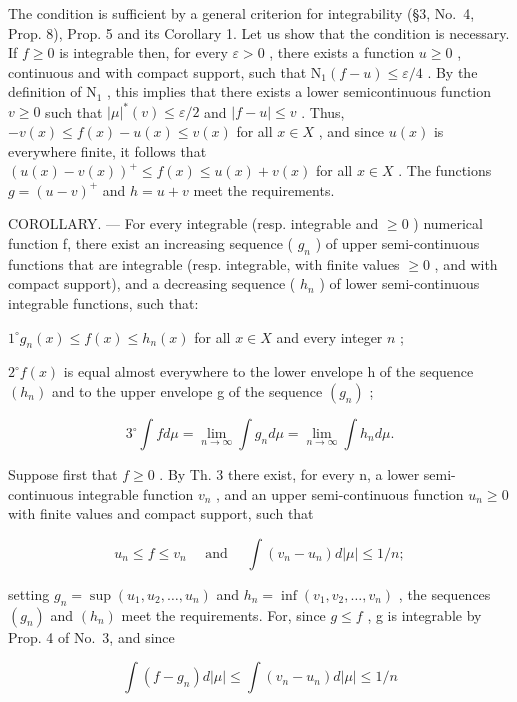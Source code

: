 The condition is sufficient by a general criterion for integrability (§3, No.~4, Prop. 8), Prop. 5 and its Corollary 1. Let us show that the condition is necessary. If \(f \geqslant 0\) is integrable then, for every \(\varepsilon > 0\) , there exists a function \(u \geqslant 0\) , continuous and with compact support, such that \(\mathrm{N}_1(f - u) \leqslant \varepsilon / 4\) . By the definition of \(\mathrm{N}_1\) , this implies that there exists a lower semicontinuous function \(v \geqslant 0\) such that \(|\mu|^*(v) \leqslant \varepsilon / 2\) and \(|f - u| \leqslant v\) . Thus, \(-v(x) \leqslant f(x) - u(x) \leqslant v(x)\) for all \(x \in X\) , and since \(u(x)\) is everywhere finite, it follows that \((u(x) - v(x))^+ \leqslant f(x) \leqslant u(x) + v(x)\) for all \(x \in X\) . The functions \(g = (u - v)^+\) and \(h = u + v\) meet the requirements.

COROLLARY. --- For every integrable (resp. integrable and \(\geqslant0\) ) numerical function f, there exist an increasing sequence ( \(g_{n}\) ) of upper semi-continuous functions that are integrable (resp. integrable, with finite values \(\geqslant0\) , and with compact support), and a decreasing sequence ( \(h_{n}\) ) of lower semi-continuous integrable functions, such that:

\(1^{\circ} g_{n}(x) \leqslant f(x) \leqslant h_{n}(x)\) for all \(x \in X\) and every integer \(n\) ;

\(2^{\circ} f(x)\) is equal almost everywhere to the lower envelope h of the sequence \((h_{n})\) and to the upper envelope g of the sequence \((g_{n})\) ;

\[
3 ^ {\circ} \int f d \mu = \lim _ {n \rightarrow \infty} \int g _ {n} d \mu = \lim _ {n \rightarrow \infty} \int h _ {n} d \mu .
\]

Suppose first that \(f \geqslant 0\) . By Th. 3 there exist, for every n, a lower semi-continuous integrable function \(v_{n}\) , and an upper semi-continuous function \(u_{n} \geqslant 0\) with finite values and compact support, such that

\[
u _ {n} \leqslant f \leqslant v _ {n} \quad \text { and } \quad \int (v _ {n} - u _ {n}) d | \mu | \leqslant 1 / n;
\]

setting \(g_{n} = \sup(u_{1}, u_{2}, \ldots, u_{n})\) and \(h_{n} = \inf(v_{1}, v_{2}, \ldots, v_{n})\) , the sequences \((g_{n})\) and \((h_{n})\) meet the requirements. For, since \(g \leqslant f\) , g is integrable by Prop. 4 of No.~3, and since

\[
\int (f - g _ {n}) d | \mu | \leqslant \int (v _ {n} - u _ {n}) d | \mu | \leqslant 1 / n
\]

